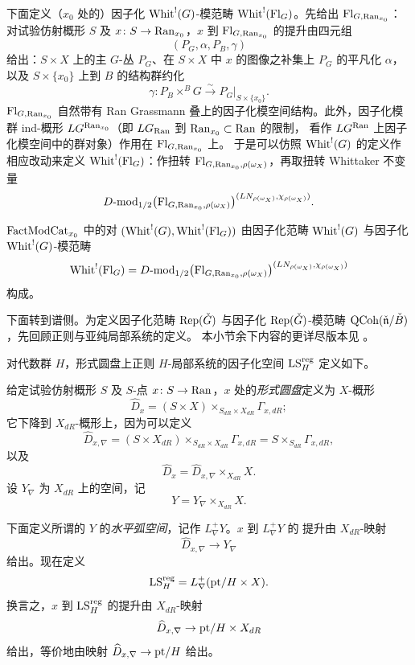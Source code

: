 下面定义（$x_0$ 处的）因子化 $\mathrm{Whit}^{!}(G)$-模范畴 $\mathrm{Whit}^{!}(\mathrm{Fl}_G)$。先给出
$\mathrm{Fl}_{G,\mathrm{Ran}_{x_0}}$：对试验仿射概形 $S$ 及 $x\colon S\to \mathrm{Ran}_{x_0}$，$x$ 到
$\mathrm{Fl}_{G,\mathrm{Ran}_{x_0}}$ 的提升由四元组
\[
(P_G,\alpha,P_B,\gamma)
\]
给出：$S\times X$ 上的主 $G$-丛 $P_G$、在 $S\times X$ 中 $x$ 的图像之补集上 $P_G$ 的平凡化
$\alpha$，以及 $S\times\{x_0\}$ 上到 $B$ 的结构群约化
\[
\gamma\colon P_B\times^B G\xrightarrow{\ \sim\ }P_G|_{S\times\{x_0\}} .
\]
$\mathrm{Fl}_{G,\mathrm{Ran}_{x_0}}$ 自然带有 Ran Grassmann 叠上的因子化模空间结构。此外，因子化模群
ind-概形 $LG^{\mathrm{Ran}_{x_0}}$（即 $LG_{\mathrm{Ran}}$ 到 $\mathrm{Ran}_{x_0}\subset \mathrm{Ran}$ 的限制，
看作 $LG^{\mathrm{Ran}}$ 上因子化模空间中的群对象）作用在 $\mathrm{Fl}_{G,\mathrm{Ran}_{x_0}}$ 上。
于是可以仿照 $\mathrm{Whit}^{!}(G)$ 的定义作相应改动来定义 $\mathrm{Whit}^{!}(\mathrm{Fl}_G)$：作扭转
$\mathrm{Fl}_{G,\mathrm{Ran}_{x_0},\rho(\omega_X)}$，再取扭转 Whittaker 不变量
\[
D\text{-}\mathrm{mod}_{1/2}\bigl(\mathrm{Fl}_{G,\mathrm{Ran}_{x_0},\rho(\omega_X)}\bigr)
^{(LN_{\rho(\omega_X)},\chi_{\rho(\omega_X)})}.
\]

\begin{definition}
\label{def:whit-Fl}
$\mathrm{FactModCat}_{x_0}$ 中的对 $(\mathrm{Whit}^{!}(G),\mathrm{Whit}^{!}(\mathrm{Fl}_G))$ 由因子化范畴
$\mathrm{Whit}^{!}(G)$ 与因子化 $\mathrm{Whit}^{!}(G)$-模范畴
\[
\mathrm{Whit}^{!}(\mathrm{Fl}_G)
=D\text{-}\mathrm{mod}_{1/2}\bigl(\mathrm{Fl}_{G,\mathrm{Ran}_{x_0},\rho(\omega_X)}\bigr)
^{(LN_{\rho(\omega_X)},\chi_{\rho(\omega_X)})}
\]
构成。
\end{definition}

下面转到谱侧。为定义因子化范畴 $\mathrm{Rep}(\check G)$ 与因子化 $\mathrm{Rep}(\check G)$-模范畴
$\mathrm{QCoh}(\check{\mathfrak{n}}/\check B)$，先回顾正则与亚纯局部系统的定义。
本小节余下内容的更详尽版本见 \cite[附录 B.3–B.7]{ABC+24a}。

对代数群 $H$，形式圆盘上正则 $H$-局部系统的因子化空间 $\mathrm{LS}^{\mathrm{reg}}_H$ 定义如下。

给定试验仿射概形 $S$ 及 $S$-点 $x\colon S\to \mathrm{Ran}$，$x$ 处的\emph{形式圆盘}定义为
$X$-概形
\[
\widehat{D}_x=(S\times X)\times_{S_{dR}\times X_{dR}}\Gamma_{x,dR};
\]
它下降到 $X_{dR}$-概形上，因为可以定义
\[
\widehat{D}_{x,\nabla}=(S\times X_{dR})\times_{S_{dR}\times X_{dR}}\Gamma_{x,dR}
=S\times_{S_{dR}}\Gamma_{x,dR},
\]
以及
\[
\widehat{D}_x=\widehat{D}_{x,\nabla}\times_{X_{dR}}X .
\]
设 $Y_\nabla$ 为 $X_{dR}$ 上的空间，记
\[
Y=Y_\nabla\times_{X_{dR}}X .
\]

下面定义所谓的 $Y$ 的\emph{水平弧空间}，记作 $L^+_\nabla Y$。$x$ 到 $L^+_\nabla Y$ 的
提升由 $X_{dR}$-映射
\[
\widehat{D}_{x,\nabla}\to Y_\nabla
\]
给出。现在定义
\[
\mathrm{LS}^{\mathrm{reg}}_H=L^+_\nabla(\mathrm{pt}/H\times X).
\]
换言之，$x$ 到 $\mathrm{LS}^{\mathrm{reg}}_H$ 的提升由 $X_{dR}$-映射
\[
\widehat{D}_{x,\nabla}\to \mathrm{pt}/H\times X_{dR}
\]
给出，等价地由映射 $\widehat{D}_{x,\nabla}\to \mathrm{pt}/H$ 给出。

